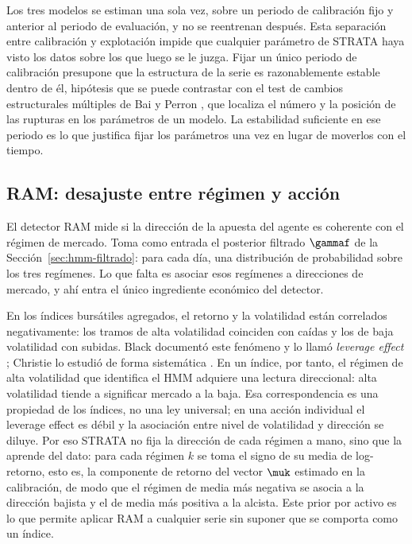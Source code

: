Los tres modelos se estiman una sola vez, sobre un periodo de calibración fijo y anterior al periodo de evaluación, y no se reentrenan después. Esta separación entre calibración y explotación impide que cualquier parámetro de STRATA haya visto los datos sobre los que luego se le juzga. Fijar un único periodo de calibración presupone que la estructura de la serie es razonablemente estable dentro de él, hipótesis que se puede contrastar con el test de cambios estructurales múltiples de Bai y Perron \cite{bai1998, bai2003}, que localiza el número y la posición de las rupturas en los parámetros de un modelo. La estabilidad suficiente en ese periodo es lo que justifica fijar los parámetros una vez en lugar de moverlos con el tiempo.

\subsection{RAM: desajuste entre régimen y acción}
\label{sec:strata-ram}

El detector RAM mide si la dirección de la apuesta del agente es coherente con el régimen de mercado. Toma como entrada el posterior filtrado $\gammaf$ de la Sección~\ref{sec:hmm-filtrado}: para cada día, una distribución de probabilidad sobre los tres regímenes. Lo que falta es asociar esos regímenes a direcciones de mercado, y ahí entra el único ingrediente económico del detector.

En los índices bursátiles agregados, el retorno y la volatilidad están correlados negativamente: los tramos de alta volatilidad coinciden con caídas y los de baja volatilidad con subidas. Black documentó este fenómeno y lo llamó \emph{leverage effect} \cite{black1976}; Christie lo estudió de forma sistemática \cite{christie1982}. En un índice, por tanto, el régimen de alta volatilidad que identifica el HMM adquiere una lectura direccional: alta volatilidad tiende a significar mercado a la baja. Esa correspondencia es una propiedad de los índices, no una ley universal; en una acción individual el leverage effect es débil y la asociación entre nivel de volatilidad y dirección se diluye. Por eso STRATA no fija la dirección de cada régimen a mano, sino que la aprende del dato: para cada régimen $k$ se toma el signo de su media de log-retorno, esto es, la componente de retorno del vector $\muk$ estimado en la calibración, de modo que el régimen de media más negativa se asocia a la dirección bajista y el de media más positiva a la alcista. Este prior por activo es lo que permite aplicar RAM a cualquier serie sin suponer que se comporta como un índice.

